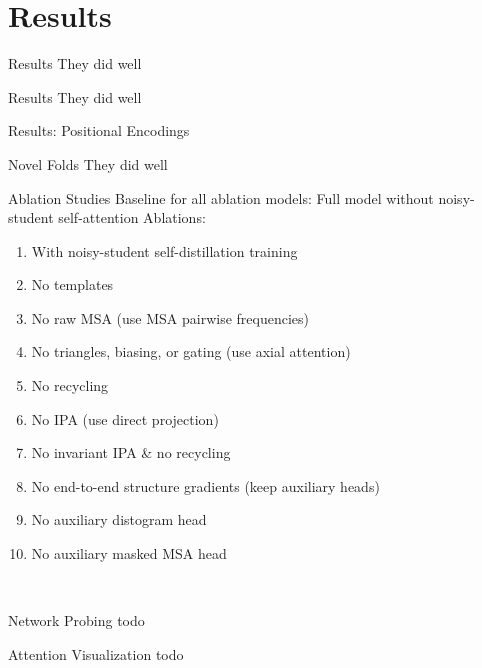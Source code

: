 \documentclass[presentation, smaller]{beamer}
\begin{document}
\section*{Results}
\label{sec:org10be86e}
\begin{frame}[label={sec:org7486702}]{Results}
They did well~\cite{jumperHighlyAccurateProtein2021}
\end{frame}
\begin{frame}[label={sec:orgef8887a}]{Results}
They did well~\cite{jumperHighlyAccurateProtein2021}
\end{frame}
\begin{frame}[label={sec:orgd3313c9}]{Results: Positional Encodings}~\cite{jumperHighlyAccurateProtein2021}
\end{frame}
\begin{frame}[label={sec:org163c054}]{Novel Folds}
They did well~\cite{jumperHighlyAccurateProtein2021}
\end{frame}
\begin{frame}[label={sec:org7868e7a}]{Ablation Studies}
Baseline for all ablation models: Full model without noisy-student self-attention
Ablations:
\begin{enumerate}
\item With noisy-student self-distillation training
\item No templates
\item No raw MSA (use MSA pairwise frequencies)
\item No triangles, biasing, or gating (use axial attention)
\item No recycling
\item No IPA (use direct projection)
\item No invariant IPA \& no recycling
\item No end-to-end structure gradients (keep auxiliary heads)
\item No auxiliary distogram head
\item No auxiliary masked MSA head
\end{enumerate}~\cite{jumperHighlyAccurateProtein2021}
\end{frame}
\begin{frame}[label={sec:org0cb40bf}]{Network Probing}
todo~\cite{jumperHighlyAccurateProtein2021}
\end{frame}
\begin{frame}[label={sec:org3755e82}]{Attention Visualization}
todo~\cite{jumperHighlyAccurateProtein2021}
\end{frame}
\begin{frame}[fragile,allowframebreaks,label=]{}
\printbibliography
\end{frame}
\end{document}
